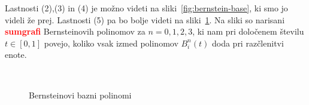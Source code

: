 \documentclass[isrm2, tisk]{fmfdelo}
\newcommand{\mycomment}[1]{\textbf{\textcolor{red}{#1}}}
\begin{document}
    Lastnosti (2),(3) in (4) je možno videti na sliki~\ref{fig:bernstein-base}, ki smo jo videli že prej.
    Lastnosti (5) pa bo bolje videti na sliki~\ref{fig:bernstein-base-sum}.
    Na sliki so narisani \mycomment{sumgrafi} Bernsteinovih polinomov za $n=0,1,2,3$, ki nam pri določenem številu $t\in[0,1]$ povejo, koliko vsak izmed polinomov $B_i^n(t)$ doda pri razčlenitvi enote.
    \begin{figure}[h!]
        \captionsetup[subfigure]{labelformat=empty}
        \centering
        \qquad
         \\
        \qquad
        \caption{Bernsteinovi bazni polinomi}
        \label{fig:bernstein-base-sum}
    \end{figure}
\end{document}
